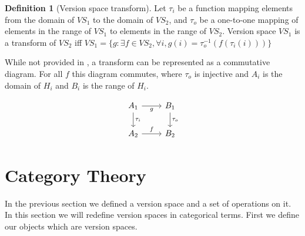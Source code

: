 \documentclass{article}
\theoremstyle{definition}
\newtheorem{definition}{Definition}[section]
\begin{document}
\begin{definition}[Version space transform]
Let $\tau_i$ be a function mapping elements from the domain of $VS_1$ to the domain of $VS_2$, and $\tau_o$ be a one-to-one mapping of elements in the range of $VS_1$ to elements in the range of $VS_2$. Version space $VS_1$ is a transform of $VS_2$ iff $VS_1 = \{g : \exists f \in VS_2, \forall i,  g(i) = \tau_o^{-1}(f(\tau_i(i)))\}$

While not provided in \cite{short}, a transform can be represented as a commutative diagram. For all $f$ this diagram commutes, where $\tau_o$ is injective and $A_i$ is the domain of $H_i$ and $B_i$ is the range of $H_i$. 

\[\begin{tikzcd}
	{A_1} & {B_1} \\
	{A_2} & {B_2}
	\arrow["{\tau_i}", from=1-1, to=2-1]
	\arrow["g"', from=1-1, to=1-2]
	\arrow["{\tau_o}", to=2-2, from=1-2]
	\arrow["f", from=2-1, to=2-2]
\end{tikzcd}\]

\end{definition}

\section{Category Theory}
In the previous section we defined a version space and a set of operations on it. In this section we will redefine version spaces in categorical terms. First we define our objects which are version spaces. 
\end{document}
